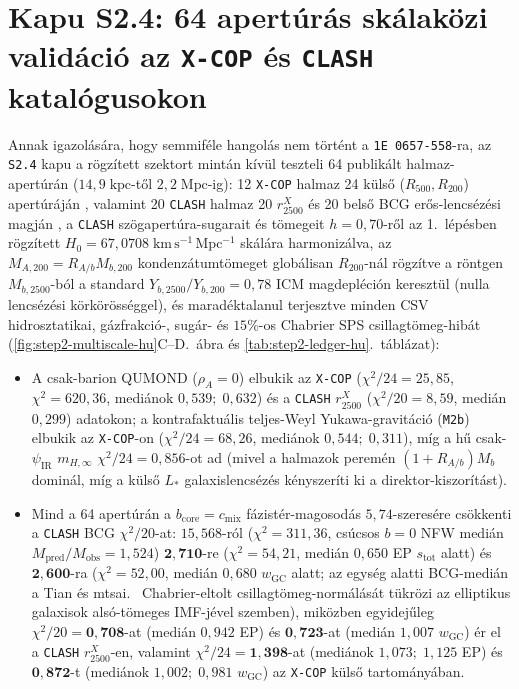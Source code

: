 \documentclass[11pt,a4paper]{article}
\begin{document}
\section{\texorpdfstring{Kapu S2.4: 64 apertúrás skálaközi validáció az \texttt{X-COP} és \texttt{CLASH} katalógusokon}{Kapu S2.4: 64 aperturas skalakozi validacio az X-COP es CLASH katalogusokon}}
\label{sec:step2-xcop-hu}
Annak igazolására, hogy semmiféle hangolás nem történt a \texttt{1E~0657-558}-ra, az \texttt{S2.4} kapu a rögzített szektort mintán kívül teszteli 64 publikált halmaz-apertúrán ($14{,}9\;\mathrm{kpc}$-től $2{,}2\;\mathrm{Mpc}$-ig): 12 \texttt{X-COP} halmaz 24 külső ($R_{500}, R_{200}$) apertúráján \cite{Eckert2019}, valamint 20 \texttt{CLASH} halmaz 20 $r_{2500}^X$ és 20 belső BCG erős-lencsézési magján \cite{Donahue2014,Umetsu2016,Tian2020}, a \texttt{CLASH} szögapertúra-sugarait és tömegeit $h = 0{,}70$-ről az 1.~lépésben rögzített $H_0 = 67{,}0708\;\mathrm{km\,s^{-1}\,Mpc^{-1}}$ skálára harmonizálva, az $M_{A,200} = R_{A/b}M_{b,200}$ kondenzátumtömeget globálisan $R_{200}$-nál rögzítve a röntgen $M_{b,2500}$-ból a standard $Y_{b,2500}/Y_{b,200} = 0{,}78$ ICM magdepléción keresztül \cite{Planelles2013,Eckert2019} (nulla lencsézési körkörösséggel), és maradéktalanul terjesztve minden CSV hidrosztatikai, gázfrakció-, sugár- és $15\%$-os Chabrier SPS csillagtömeg-hibát (\ref{fig:step2-multiscale-hu}C--D.~ábra és \ref{tab:step2-ledger-hu}.~táblázat):
\begin{itemize}
    \item A csak-barion QUMOND ($\rho_A = 0$) elbukik az \texttt{X-COP} ($\chi^2/24 = 25{,}85$, $\chi^2 = 620{,}36$, mediánok $0{,}539;\; 0{,}632$) és a \texttt{CLASH} $r_{2500}^X$ ($\chi^2/20 = 8{,}59$, medián $0{,}299$) adatokon; a kontrafaktuális teljes-Weyl Yukawa-gravitáció (\texttt{M2b}) elbukik az \texttt{X-COP}-on ($\chi^2/24 = 68{,}26$, mediánok $0{,}544;\; 0{,}311$), míg a hű csak-$\psi_{\mathrm{IR}}$ $m_{H,\infty}$ $\chi^2/24 = 0{,}856$-ot ad (mivel a halmazok peremén $(1+R_{A/b})M_b$ dominál, míg a külső $L_*$ galaxislencsézés kényszeríti ki a direktor-kiszorítást).
    \item Mind a 64 apertúrán a $b_{\mathrm{core}} = c_{\mathrm{mix}}$ fázistér-magosodás $5{,}74$-szeresére csökkenti a \texttt{CLASH} BCG $\chi^2/20$-at: $15{,}568$-ról ($\chi^2 = 311{,}36$, csúcsos $b=0$ NFW medián $M_{\mathrm{pred}}/M_{\mathrm{obs}} = 1{,}524$) $\mathbf{2{,}710}$-re ($\chi^2 = 54{,}21$, medián $0{,}650$ EP $s_{\mathrm{tot}}$ alatt) és $\mathbf{2{,}600}$-ra ($\chi^2 = 52{,}00$, medián $0{,}680$ $w_{\mathrm{GC}}$ alatt; az egység alatti BCG-medián a Tian és mtsai.\ \cite{Tian2020} Chabrier-eltolt csillagtömeg-normálását tükrözi az elliptikus galaxisok alsó-tömeges IMF-jével szemben), miközben egyidejűleg $\chi^2/20 = \mathbf{0{,}708}$-at (medián $0{,}942$ EP) és $\mathbf{0{,}723}$-at (medián $1{,}007$ $w_{\mathrm{GC}}$) ér el a \texttt{CLASH} $r_{2500}^X$-en, valamint $\chi^2/24 = \mathbf{1{,}398}$-at (mediánok $1{,}073;\; 1{,}125$ EP) és $\mathbf{0{,}872}$-t (mediánok $1{,}002;\; 0{,}981$ $w_{\mathrm{GC}}$) az \texttt{X-COP} külső tartományában.
\end{itemize}
\end{document}
